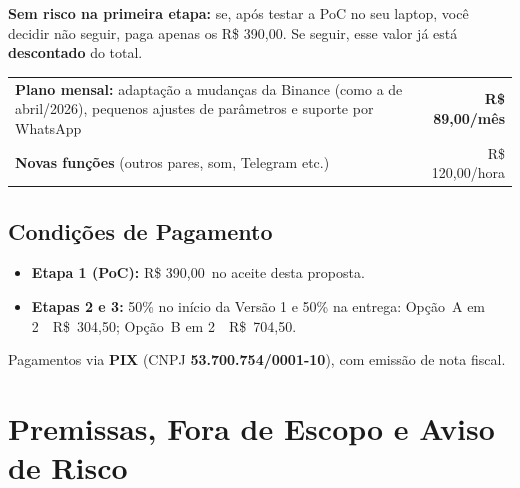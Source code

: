 \documentclass[11pt,a4paper]{article}
\newcommand{\icoCheck} {\textcolor{sinalW}{\ding{51}}}
\newcommand{\icoStar}  {\textcolor{gold}{\ding{72}}}
\newcommand{\valPoc}{390,00}
\newcommand{\valAparc}{304,50}
\newcommand{\valBparc}{704,50}
\newcommand{\valSuporte}{89,00}
\newcommand{\valHora}{120,00}
\begin{document}
\begin{tcolorbox}[greenbox]
  \small\textbf{Sem risco na primeira etapa:} se, após testar a PoC no seu laptop, você decidir não
  seguir, paga apenas os R\$ \valPoc. Se seguir, esse valor já está \textbf{descontado} do total.
\end{tcolorbox}

\begin{tcolorbox}[pricebox, title={\color{navy}\icoStar\enspace Suporte e Evolução (opcional, após a garantia)}, colbacktitle=gold]
  \renewcommand{\arraystretch}{1.35}
  \begin{tabularx}{\linewidth}{@{}X r@{}}
    \textbf{Plano mensal:} adaptação a mudanças da Binance (como a de abril/2026), pequenos ajustes de
    parâmetros e suporte por WhatsApp & \textbf{\color{gold}R\$ \valSuporte/mês} \\
    \textbf{Novas funções} (outros pares, som, Telegram etc.) & R\$ \valHora/hora \\
  \end{tabularx}
\end{tcolorbox}

\subsection{Condições de Pagamento}

\begin{itemize}[leftmargin=1.8em, itemsep=3pt]
  \item[\icoCheck] \textbf{Etapa 1 (PoC):} R\$ \valPoc\ no aceite desta proposta.
  \item[\icoCheck] \textbf{Etapas 2 e 3:} 50\% no início da Versão 1 e 50\% na entrega:
    Opção~A em 2~\texttimes~R\$~\valAparc; Opção~B em 2~\texttimes~R\$~\valBparc.
\end{itemize}
Pagamentos via \textbf{PIX} (CNPJ \textbf{53.700.754/0001-10}), com emissão de nota fiscal.

\section{Premissas, Fora de Escopo e Aviso de Risco}
\end{document}
